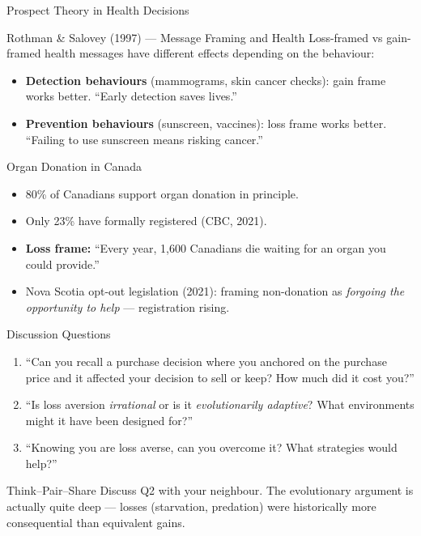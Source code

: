 \documentclass[aspectratio=169]{beamer}
\begin{document}
\begin{frame}{Prospect Theory in Health Decisions}
\begin{block}{Rothman \& Salovey (1997) --- Message Framing and Health}
Loss-framed vs gain-framed health messages have different effects depending on the behaviour:
\begin{itemize}
  \item \textbf{Detection behaviours} (mammograms, skin cancer checks): \alert{gain frame} works better. ``Early detection saves lives.''
  \item \textbf{Prevention behaviours} (sunscreen, vaccines): \alert{loss frame} works better. ``Failing to use sunscreen means risking cancer.''
\end{itemize}
\end{block}
\begin{exampleblock}{Organ Donation in Canada}
\begin{itemize}
  \item 80\% of Canadians support organ donation in principle.
  \item Only 23\% have formally registered (CBC, 2021).
  \item \textbf{Loss frame:} ``Every year, 1,600 Canadians die waiting for an organ you could provide.''
  \item Nova Scotia opt-out legislation (2021): framing non-donation as \textit{forgoing the opportunity to help} --- registration rising.
\end{itemize}
\end{exampleblock}
\end{frame}

\begin{frame}{Discussion Questions}
\begin{enumerate}
  \item[\textcolor{bepurple}{Q1.}] ``Can you recall a purchase decision where you anchored on the purchase price and it affected your decision to sell or keep? How much did it cost you?''
  \medskip
  \item[\textcolor{beteal}{Q2.}] ``Is loss aversion \textit{irrational} or is it \textit{evolutionarily adaptive}? What environments might it have been designed for?''
  \medskip
  \item[\textcolor{berust}{Q3.}] ``Knowing you are loss averse, can you overcome it? What strategies would help?''
\end{enumerate}
\medskip
\begin{block}{Think--Pair--Share}
Discuss Q2 with your neighbour. The evolutionary argument is actually quite deep --- losses (starvation, predation) were historically more consequential than equivalent gains.
\end{block}
\end{frame}
\end{document}
